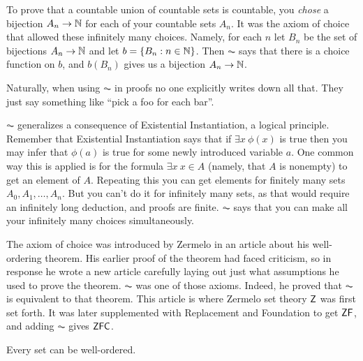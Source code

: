 \documentclass[10pt]{amsart}
\begin{document}
\begin{example}
To prove that a countable union of countable sets is countable, you \emph{chose} a bijection $A_n \to \mathbb{N}$ for each of your countable sets $A_n$. It was the axiom of choice that allowed these infinitely many choices. Namely, for each $n$ let $B_n$ be the set of bijections $A_n \to \mathbb{N}$ and let $b = \{ B_n : n \in \mathbb{N} \}$. Then $\AC$ says that there is a choice function on $b$, and $b(B_n)$ gives us a bijection $A_n \to \mathbb{N}$.

Naturally, when using $\AC$ in proofs no one explicitly writes down all that. They just say something like ``pick a foo for each bar''.
\end{example}

$\AC$ generalizes a consequence of Existential Instantiation, a logical principle. Remember that Existential Instantiation says that if $\exists x\ \phi(x)$ is true then you may infer that $\phi(a)$ is true for some newly introduced variable $a$. One common way this is applied is for the formula $\exists x\ x \in A$ (namely, that $A$ is nonempty) to get an element of $A$. Repeating this you can get elements for finitely many sets $A_0, A_1, \ldots, A_n$. But you can't do it for infinitely many sets, as that would require an infinitely long deduction, and proofs are finite. $\AC$ says that you can make all your infinitely many choices simultaneously. 

The axiom of choice was introduced by Zermelo in an article about his well-ordering theorem. His earlier proof of the theorem had faced criticism, so in response he wrote a new article carefully laying out just what assumptions he used to prove the theorem. $\AC$ was one of those axioms. Indeed, he proved that $\AC$ is equivalent to that theorem. This article is where Zermelo set theory $\mathsf{Z}$ was first set forth. It was later supplemented with Replacement and Foundation to get $\mathsf{ZF}$, and adding $\AC$ gives $\mathsf{ZFC}$.

\begin{theorem}
Every set can be well-ordered.
\end{theorem}
\end{document}
